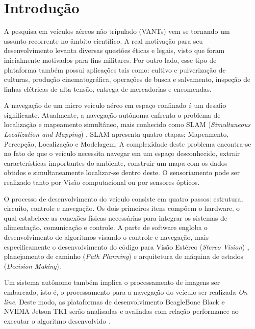 \chapter{Introdução}
\label{Introducao}

A pesquisa em veículos aéreos não tripulado (VANTs) vem se tornando um assunto recorrente no âmbito científico. A real motivação para seu desenvolvimento levanta diversas questões éticas e legais, visto que foram inicialmente motivados para fins militares. Por outro lado, esse tipo de plataforma também possui aplicações tais como: cultivo e pulverização de culturas, produção cinematográfica, operações de busca e salvamento, inspeção de linhas elétricas de alta tensão, entrega de mercadorias e encomendas.

A navegação de um micro veículo aéreo em espaço confinado é um desafio significante. Atualmente, a navegação autônoma enfrenta o problema de localização e mapeamento simultâneo, mais conhecido como SLAM (\textit{Simultaneous Localization and Mapping}) \cite{Dissanayake2001}. SLAM apresenta quatro etapas: Mapeamento, Percepção, Localização e Modelagem. A complexidade deste problema encontra-se no fato de que o veículo necessita navegar em um espaço desconhecido, extrair características importantes do ambiente, construir um mapa com os dados obtidos e simultaneamente localizar-se dentro deste. O sensoriamento pode ser realizado tanto por Visão computacional ou por sensores ópticos. 

O processo de desenvolvimento do veículo consiste em quatro passos: estrutura, circuito, controle e navegação. Os dois primeiros itens compõem o hardware, o qual estabelece as conexões físicas necessárias para integrar os sistemas de alimentação, comunicação e controle. A parte de software engloba o desenvolvimento de algoritmos visando o controle e navegação, mais especificamente o desenvolvimento do código para Visão Estéreo (\textit{Stereo Vision}) \cite{Lemaire2007}, planejamento de caminho (\textit{Path Planning}) e arquitetura de máquina de estados (\textit{Decision Making}).

Um sistema autônomo também implica o processamento de imagens ser embarcado, isto é, o processamento para a navegação do veículo ser realizada \textit{On-line}. Deste modo, as plataformas de desenvolvimento BeagleBone Black e NVIDIA Jetson TK1 serão analisadas e avaliadas com relação performance ao executar o algoritmo desenvolvido \cite{Shah2014}. 


